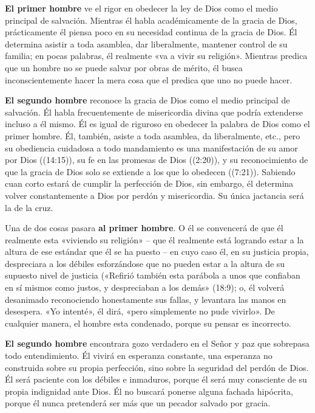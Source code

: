 \documentclass[12pt, twoside, openright]{book}
\begin{document}
\textbf{El primer hombre} ve el rigor en obedecer la ley de Dios como el medio principal de salvación. Mientras él habla académicamente de la gracia de Dios, prácticamente él piensa poco en su necesidad continua de la gracia de Dios. Él determina asistir a toda asamblea, dar liberalmente, mantener control de su familia; en pocas palabras, él realmente «va a vivir su religión».  Mientras predica que un hombre no se puede salvar por obras de mérito, él busca inconscientemente hacer la mera cosa que el predica que uno no puede hacer. 

\textbf{El segundo hombre} reconoce la gracia de Dios como el medio principal de salvación. Él habla frecuentemente de misericordia divina que podría extenderse incluso a él mismo. Él es igual de riguroso en obedecer la palabra de Dios como el primer hombre. Él, también, asiste a toda asamblea, da liberalmente, etc., pero su obediencia cuidadosa a todo mandamiento es una manifestación de su amor por Dios ((14:15)), su fe en las promesas de Dios ((2:20)), y su reconocimiento de que la gracia de Dios solo se extiende a los que lo obedecen ((7:21)). Sabiendo cuan corto estará de cumplir la perfección de Dios, sin embargo, él determina volver constantemente a Dios por perdón y misericordia. Su única jactancia será la de la cruz. 

Una de dos cosas pasara \textbf{al primer hombre}. O él se convencerá de que él realmente esta «viviendo su religión» – que él realmente está logrando estar a la altura de ese estándar que él se ha puesto – en cuyo caso él, en su justicia propia, despreciara a los débiles esforzándose que no pueden estar a la altura de su supuesto nivel de justicia («Refirió también esta parábola a unos que confiaban en sí mismos como justos, y despreciaban a los demás» (18:9); o, él volverá desanimado reconociendo honestamente sus fallas, y levantara las manos en desespera. «Yo intenté», él dirá, «pero simplemente no pude vivirlo». De cualquier manera, el hombre esta condenado, porque su pensar es incorrecto.

\textbf{El segundo hombre} encontrara gozo verdadero en el Señor y paz que sobrepasa todo entendimiento. Él vivirá en esperanza constante, una esperanza no construida sobre su propia perfección, sino sobre la seguridad del perdón de Dios. Él será paciente con los débiles e inmaduros, porque él será muy consciente de su propia indignidad ante Dios. Él no buscará ponerse alguna fachada hipócrita, porque él nunca pretenderá ser más que un pecador salvado por gracia. 
\end{document}
